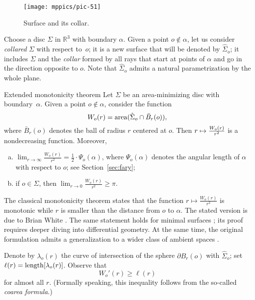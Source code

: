 \begin{wrapfigure}{r}{35 mm}
\vskip-5mm
\centering
\texttt{[image: mppics/pic-51]}
\caption*{Surface and its collar.}
\vskip0mm
\end{wrapfigure}

Choose a disc $\Sigma$ in $\mathbb{R}^3$ with boundary $\alpha$.
Given a point $o\notin \alpha$, let us consider \emph{collared} $\Sigma$ with respect to~$o$;
it is a new surface that will be denoted by $\hat\Sigma_o$;
it includes $\Sigma$ and the \emph{collar} formed by all rays that start at points of $\alpha$ and go in the direction opposite to $o$.
Note that $\hat\Sigma_o$ admits a natural parametrization by the whole plane.

\begin{thm}{Extended monotonicity theorem}\label{thm:monotonicity}
Let $\Sigma$ be an area-minimizing disc with boundary~$\alpha$.
Given a point $o\notin \alpha$, consider the function 
\[W_o(r)=\mathop{\rm area}\nolimits (\hat\Sigma_o\cap \bar B_r(o)),\]
where $\bar B_r(o)$ denotes the ball of radius $r$ centered at $o$.
Then $r\z\mapsto \frac{W_o(r)}{r^2}$ is a nondecreasing function.
Moreover, 

\begin{enumerate}[(a)]
\item\label{thm:monotonicity:a}
$\lim_{r\to\infty}\frac{W_o(r)}{r^2}=\tfrac12\cdot \Psi_o(\alpha)$, where $\Psi_o(\alpha)$ denotes the angular length of $\alpha$ with respect to $o$; see Section~\ref{sec:fary};

\item\label{thm:monotonicity:b}
if $o\in \Sigma$, then $\lim_{r\to0}\frac{W_o(r)}{r^2}\ge \pi$.
\end{enumerate}

\end{thm}

The classical monotonicity theorem states that the function $r\mapsto \frac{W_o(r)}{r^2}$ is monotonic 
while $r$ is smaller than the distance from $o$ to $\alpha$.
The stated version is due to Brian White \cite{white}.
The same statement holds for minimal surfaces \cite{EWW_embed}; its proof requires deeper diving into differential geometry.
At the same time, the original formulation admits a generalization to a wider class of ambient spaces \cite{St_structure}.


Denote by $\lambda_o(r)$ the curve of intersection of the sphere $\partial B_r(o)$ with $\hat\Sigma_o$;
set $\ell(r)\z=\length[\lambda_o(r)]$.
Observe that 
\[W_o'(r)\ge \ell(r)\]
for almost all $r$.
(Formally speaking, this inequality follows from the so-called \emph{coarea formula}.)

